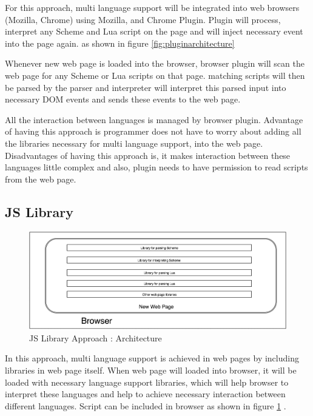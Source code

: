   For this approach, multi language support will be integrated into web browsers (Mozilla, Chrome) using Mozilla, and Chrome Plugin. Plugin will process, interpret any Scheme and Lua script on the page and will inject necessary event into the page again. as shown in figure \ref{fig:pluginarchitecture}
	 
  Whenever new web page is loaded into the browser, browser plugin will scan the web page for any Scheme or Lua scripts on that page. matching scripts will then be parsed by the parser and interpreter will interpret this parsed input into necessary DOM events and sends these events to the web page. 
  
  All the interaction between languages is managed by browser plugin. Advantage of having this approach is programmer does not have to worry about adding all the libraries necessary for multi language support, into the web page. Disadvantages of having this approach is, it makes interaction between these languages little complex and also, plugin needs to have permission to read scripts from the web page.
  
	
\subsection{JS Library}

\begin{figure}[ht]
	\begin{center}
		\includegraphics[width=\linewidth]{./images/JSLibraryApproach.png}
	\end{center}
	\caption{JS Library Approach : Architecture}
	\label{fig:jslibraryarchitecture}
\end{figure}

   In this approach, multi language support is achieved in web pages by including libraries in web page itself. When web page will loaded into browser, it will be loaded with necessary language support libraries, which will help browser to interpret these languages and help to achieve necessary interaction between different languages. Script can be included in browser as shown in figure \ref{fig:jslibraryarchitecture} .
   
